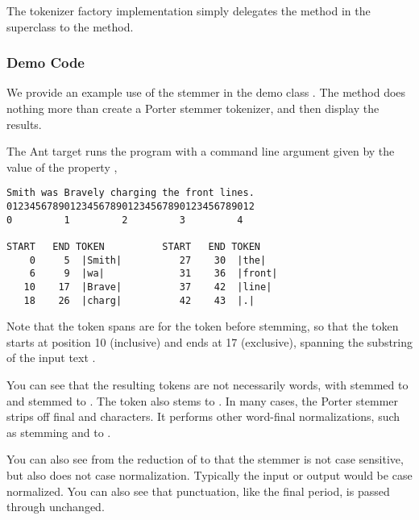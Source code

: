 The tokenizer factory implementation simply delegates
the  method in the superclass
 to the  method.

\subsubsection{Demo Code}

We provide an example use of the stemmer in the demo class
.  The  method does nothing
more than create a Porter stemmer tokenizer,
%
%
and then display the results.  

The Ant target  runs the program
with a command line argument given by the value of the property
,
%
\begin{verbatim}
Smith was Bravely charging the front lines.
0123456789012345678901234567890123456789012
0         1         2         3         4

START   END TOKEN          START   END TOKEN
    0     5  |Smith|          27    30  |the|
    6     9  |wa|             31    36  |front|
   10    17  |Brave|          37    42  |line|
   18    26  |charg|          42    43  |.|
\end{verbatim}
%
Note that the token spans are for the token before stemming,
so that the token  starts at position
10 (inclusive) and ends at 17 (exclusive), spanning the substring
of the input text .  

You can see that the resulting tokens are not necessarily words,
with  stemmed to  and
 stemmed to .  The
token  also stems to .  In
many cases, the Porter stemmer strips off final  and
 characters.  It performs other word-final normalizations,
such as stemming  and
 to .

You can also see from the reduction of 
to  that the stemmer is not case sensitive,
but also does not case normalization.  Typically the input or output
would be case normalized.  You can also see that punctuation, like
the final period, is passed through unchanged.

